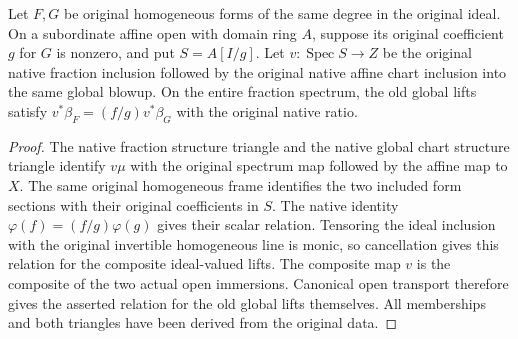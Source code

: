 \begin{proposition}
\label{prop:whole-original-global-form-fraction-ratios}
\leanok
{}
Let $F,G$ be original homogeneous forms of the same degree in the original
ideal. On a subordinate affine open with domain ring $A$, suppose its original
coefficient $g$ for $G$ is nonzero, and put $S=A[I/g]$. Let $v:\operatorname{Spec}S\to Z$
be the original native fraction inclusion followed by the original native affine
chart inclusion into the same global blowup. On the entire fraction spectrum,
the old global lifts satisfy $v^*\beta_F=(f/g)v^*\beta_G$ with the original native ratio.
\end{proposition}
\begin{proof}
The native fraction structure triangle and the native global chart structure
triangle identify $v\mu$ with the original spectrum map followed by the affine
map to $X$. The same original homogeneous frame identifies the two included
form sections with their original coefficients in $S$. The native identity
$\varphi(f)=(f/g)\varphi(g)$ gives their scalar relation. Tensoring the ideal
inclusion with the original invertible homogeneous line is monic, so cancellation
gives this relation for the composite ideal-valued lifts. The composite map $v$
is the composite of the two actual open immersions. Canonical open transport
therefore gives the asserted relation for the old global lifts themselves.
All memberships and both triangles have been derived from the original data.
\end{proof}
